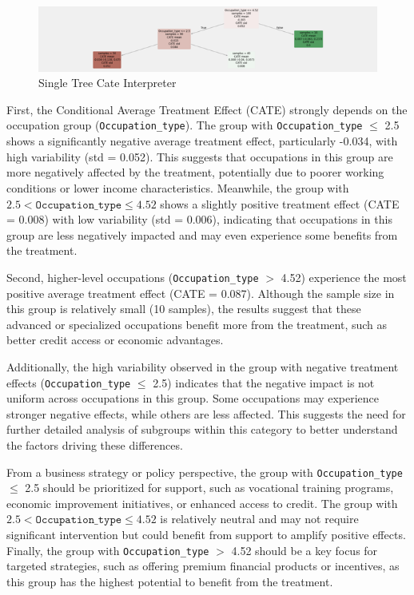 \documentclass[12pt]{report}
\begin{document}
    \begin{figure}[h!]
        \centering
        \includegraphics[width=\textwidth]{resources/pic/SingleTreeCateInterpreter.png}
        \caption{Single Tree Cate Interpreter}
        \label{fig:Single Tree Cate Interpreter}
    \end{figure}

    First, the Conditional Average Treatment Effect (CATE) strongly depends on the occupation group (\texttt{Occupation\_type}). The group with \texttt{Occupation\_type} \(\leq\) 2.5 shows a significantly negative average treatment effect, particularly -0.034, with high variability (std = 0.052). This suggests that occupations in this group are more negatively affected by the treatment, potentially due to poorer working conditions or lower income characteristics. Meanwhile, the group with \(2.5 < \texttt{Occupation\_type} \leq 4.52\) shows a slightly positive treatment effect (CATE = 0.008) with low variability (std = 0.006), indicating that occupations in this group are less negatively impacted and may even experience some benefits from the treatment.
    
    Second, higher-level occupations (\texttt{Occupation\_type} \(>\) 4.52) experience the most positive average treatment effect (CATE = 0.087). Although the sample size in this group is relatively small (10 samples), the results suggest that these advanced or specialized occupations benefit more from the treatment, such as better credit access or economic advantages.
    
    Additionally, the high variability observed in the group with negative treatment effects (\texttt{Occupation\_type} \(\leq\) 2.5) indicates that the negative impact is not uniform across occupations in this group. Some occupations may experience stronger negative effects, while others are less affected. This suggests the need for further detailed analysis of subgroups within this category to better understand the factors driving these differences.
    
    From a business strategy or policy perspective, the group with \texttt{Occupation\_type} \(\leq\) 2.5 should be prioritized for support, such as vocational training programs, economic improvement initiatives, or enhanced access to credit. The group with \(2.5 < \texttt{Occupation\_type} \leq 4.52\) is relatively neutral and may not require significant intervention but could benefit from support to amplify positive effects. Finally, the group with \texttt{Occupation\_type} \(>\) 4.52 should be a key focus for targeted strategies, such as offering premium financial products or incentives, as this group has the highest potential to benefit from the treatment.
\end{document}
